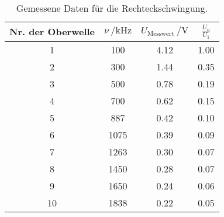 \begin{table}[H]
  \centering
   \begin{tabular}{c c c c}
    \toprule
    Nr. der Oberwelle & $ \nu \: / \si{\kHz}$ & $ U_{\text{Messwert}} \: / \si{\volt} $
    & $\frac{U_{n}}{U_{1}} $  \\
    \midrule
    1 & 100 & 4.12 & 1.00 \\
    2 & 300 & 1.44 & 0.35 \\
    3 & 500 & 0.78 & 0.19 \\
    4 & 700 & 0.62 & 0.15 \\
    5 & 887 & 0.42 & 0.10 \\
    6 & 1075 & 0.39 & 0.09 \\
    7 & 1263 & 0.30 & 0.07 \\
    8 & 1450 & 0.28 & 0.07 \\
    9 & 1650 & 0.24 & 0.06 \\
    10 & 1838 & 0.22 & 0.05 \\
    \bottomrule
  \end{tabular}
  \caption{Gemessene Daten für die Rechteckschwingung.}
  \label{tab:tabe1}
\end{table}
